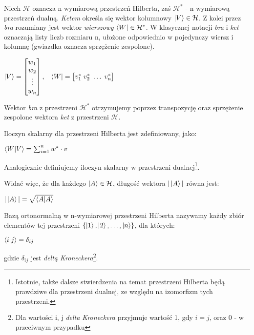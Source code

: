 \documentclass[12pt,a4paper,twoside,openany]{book}
\begin{document}
Niech $\mathcal{H}$ oznacza n-wymiarową przestrzeń Hilberta, zaś $\mathcal{H}^\ast$ - n-wymiarową przestrzeń dualną. \textit{Ketem} określa się wektor kolumnowy $\ket{V}\in\mathcal{H}$. Z kolei przez \textit{bra} rozumiany jest wektor \textit{wierszowy} $\bra{W}\in\mathcal{H}^\ast$. W klasycznej notacji \textit{bra} i \textit{ket} oznaczają listy liczb rozmiaru n, ułożone odpowiednio w pojedynczy wiersz i kolumnę (gwiazdka oznacza sprzężenie zespolone).
~\newline
~\newline
\begin{center}
    

$\ket{V} = \begin{bmatrix}
           w_{1} \\
           w_{2} \\
           \vdots \\
           w_{n}
           \end{bmatrix}, \;\;\; \bra{W} = \begin{bmatrix}
           v_{1}^\ast \; 
           v_{2}^\ast \;
           \hdots \;
           v_{n}^\ast
           \end{bmatrix}$
\end{center}

Wektor \textit{bra} z przestrzeni $\mathcal{H}^\ast$ otrzymujemy poprzez transpozycję oraz sprzężenie zespolone wektora \textit{ket} z przestrzeni $\mathcal{H}$.\newline

Iloczyn skalarny dla przestrzeni Hilberta jest zdefiniowany, jako:
\begin{center}
$\bra{W}\ket{V} = \sum_{i=1}^{n} w^\ast \cdot v$
\end{center}
Analogicznie definiujemy iloczyn skalarny w przestrzeni dualnej\footnote{Istotnie, także dalsze stwierdzenia na temat przestrzeni Hilberta będą prawdziwe dla przestrzeni dualnej, ze względu na izomorfizm tych przestrzeni.}.\newline

Widać więc, że dla każdego $\ket{A}\in\mathcal{H}$, długość wektora $|\ket{A}|$ równa jest:
\begin{center}
    $|\ket{A}| = \sqrt{\braket{A}}$
\end{center}

Bazą ortonormalną w n-wymiarowej przestrzeni Hilberta nazywamy każdy zbiór elementów tej przestrzeni $\{\ket{1}, \ket{2}, \hdots, \ket{n}\}$, dla których:
\begin{center}
    $\bra{i}\ket{j} = \delta_{ij}$
\end{center}
gdzie $\delta_{ij}$ jest \textit{deltą Kroneckera}\footnote{Dla wartości i, j \textit{delta Kroneckera} przyjmuje wartość 1, gdy $i = j$, oraz 0 - w przeciwnym przypadku}.
\end{document}

